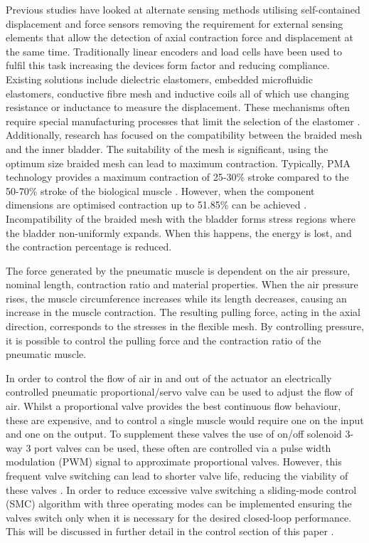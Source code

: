 \documentclass[11pt,a4paper]{article}
\begin{document}
Previous studies have looked at alternate sensing methods utilising self-contained displacement and force sensors removing the requirement for external sensing elements that allow the detection of axial contraction force and displacement at the same time. Traditionally linear encoders and load cells have been used to fulfil this task increasing the devices form factor and reducing compliance. Existing solutions include dielectric elastomers, embedded microfluidic elastomers, conductive fibre mesh and inductive coils all of which use changing resistance or inductance to measure the displacement. These mechanisms often require special manufacturing processes that limit the selection of the elastomer \cite{erin_pol_valle_park_2016}. 
Additionally, research has focused on the compatibility between the braided mesh and the inner bladder. The suitability of the mesh is significant, using the optimum size braided mesh can lead to maximum contraction. 
Typically, PMA technology provides a maximum contraction of 25-30\% stroke compared to the 50-70\% stroke of the biological muscle \cite{andrikopoulos_nikolakopoulos_2017}. However, when the component dimensions are optimised contraction up to 51.85\% can be achieved \cite{najmuddin_mustaffa_2017}. Incompatibility of the braided mesh with the bladder forms stress regions where the bladder non-uniformly expands. When this happens, the energy is lost, and the contraction percentage is reduced. \newline

The force generated by the pneumatic muscle is dependent on the air pressure, nominal length, contraction ratio and material properties. When the air pressure rises, the muscle circumference increases while its length decreases, causing an increase in the muscle contraction. The resulting pulling force, acting in the axial direction, corresponds to the stresses in the flexible mesh. By controlling pressure, it is possible to control the pulling force and the contraction ratio of the pneumatic muscle. \newline

In order to control the flow of air in and out of the actuator an electrically controlled pneumatic proportional/servo valve can be used to adjust the flow of air. Whilst a proportional valve provides the best continuous flow behaviour, these are expensive, and to control a single muscle would require one on the input and one on the output. To supplement these valves the use of on/off solenoid 3-way 3 port valves can be used, these often are controlled via a pulse width modulation (PWM) signal to approximate proportional valves. However, this frequent valve switching can lead to shorter valve life, reducing the viability of these valves \cite{zhang_bone_2018}. In order to reduce excessive valve switching a sliding-mode control (SMC) algorithm with three operating modes can be implemented ensuring the valves switch only when it is necessary for the desired closed-loop performance. This will be discussed in further detail in the control section of this paper . \newline
\end{document}

